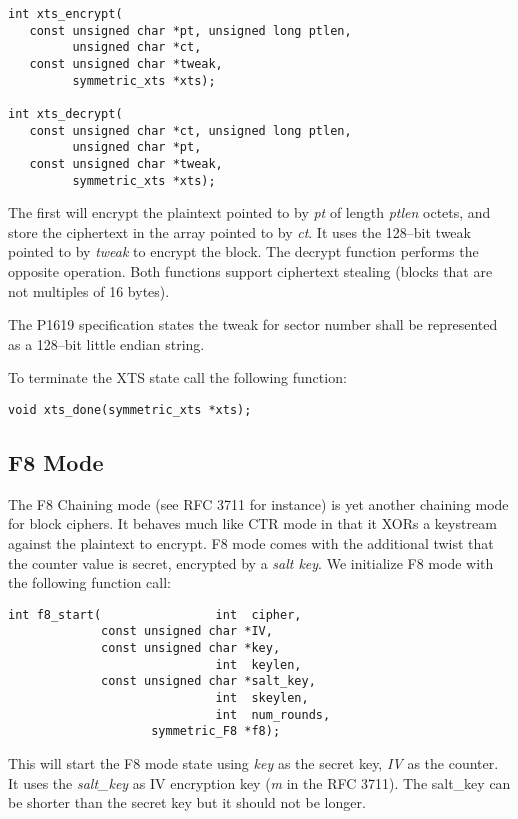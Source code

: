 \documentclass[synpaper]{book}
\begin{document}
 
\begin{verbatim}
int xts_encrypt(
   const unsigned char *pt, unsigned long ptlen,
         unsigned char *ct,
   const unsigned char *tweak,
         symmetric_xts *xts);

int xts_decrypt(
   const unsigned char *ct, unsigned long ptlen,
         unsigned char *pt,
   const unsigned char *tweak,
         symmetric_xts *xts);
\end{verbatim}
The first will encrypt the plaintext pointed to by \textit{pt} of length \textit{ptlen} octets, and store the ciphertext in the array pointed to by
\textit{ct}.  It uses the 128--bit tweak pointed to by \textit{tweak} to encrypt the block.  The decrypt function performs the opposite operation.  Both
functions support ciphertext stealing (blocks that are not multiples of 16 bytes).

The P1619 specification states the tweak for sector number shall be represented as a 128--bit little endian string.

To terminate the XTS state call the following function:

\begin{verbatim}
void xts_done(symmetric_xts *xts);
\end{verbatim}


\subsection{F8 Mode}
The F8 Chaining mode (see RFC 3711 for instance) is yet another chaining mode for block ciphers.  It behaves much like CTR mode in that it XORs a keystream
against the plaintext to encrypt.  F8 mode comes with the additional twist that the counter value is secret, encrypted by a \textit{salt key}.  We
initialize F8 mode with the following function call:

\begin{verbatim}
int f8_start(                int  cipher,
             const unsigned char *IV,
             const unsigned char *key,
                             int  keylen,
             const unsigned char *salt_key,
                             int  skeylen,
                             int  num_rounds,
                    symmetric_F8 *f8);
\end{verbatim}
This will start the F8 mode state using \textit{key} as the secret key, \textit{IV} as the counter.  It uses the \textit{salt\_key} as IV encryption key
(\textit{m} in the RFC 3711).  The salt\_key can be shorter than the secret key but it should not be longer.
\end{document}
